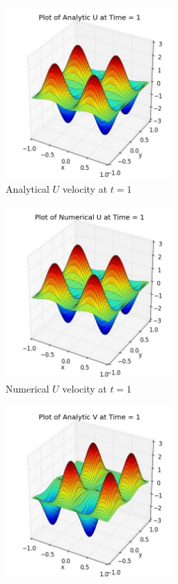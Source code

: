 \begin{figure}[H]
	\centering
	\begin{subfigure}[t]{2.5in}
		\centering
		\includegraphics[width=2.5in]{figures/Pm1a_pf2_U_exact_t_1_grid_60 - Copy.jpg}
		\caption{Analytical $U$ velocity at $t=1$}\label{fig:6.1a}		
	\end{subfigure}
	\quad
	\begin{subfigure}[t]{2.5in}
		\centering
		\includegraphics[width=2.5in]{figures/Pm1a_pf2_uf_t_1_grid_60 - Copy.jpg}
		\caption{Numerical $U$ velocity at $t=1$}\label{fig:6.1b}
	\end{subfigure}
	\quad
	\begin{subfigure}[t]{2.5in}
		\centering
		\includegraphics[width=2.5in]{figures/Pm1a_pf2_V_exact_t_1_grid_60 - Copy.jpg}

\end{subfigure}
\end{figure}
